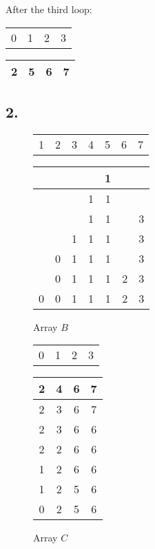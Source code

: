 \documentclass[a4paper,12pt]{article}
\begin{document}
After the third loop:
\begin{center}
	\begin{tabular}{cccc}
		0 & 1 & 2 & 3 \\
	\end{tabular}

	\begin{tabular}{|c|c|c|c|}
		\hline 
		2 & 5 & 6 & 7 \\
		\hline
	\end{tabular}
\end{center}

\subsection*{2.}

\begin{figure}[H]
	\begin{minipage}{0.5\textwidth}
		\centering
		\begin{tabular}{ccccccc}
			1 & 2 & 3 & 4 & 5 & 6 & 7 \\
		\end{tabular}

		\begin{tabular}{|c|c|c|c|c|c|c|}
			\hline
			& & & & 1 & & \\ \hline \hline
			& & & 1 & 1 & & \\ \hline \hline
			& & & 1 & 1 & & 3 \\ \hline \hline
			& & 1 & 1 & 1 & & 3 \\ \hline \hline
			& 0 & 1 & 1 & 1 & & 3 \\ \hline \hline
			& 0 & 1 & 1 & 1 & 2 & 3 \\ \hline \hline
			0 & 0 & 1 & 1 & 1 & 2 & 3 \\ \hline
		\end{tabular}
		\caption*{Array $B$}
	\end{minipage}
	\begin{minipage}{0.5\textwidth}
		\centering
		\begin{tabular}{cccc}
			0 & 1 & 2 & 3 \\
		\end{tabular}

		\begin{tabular}{|c|c|c|c|}
			\hline
			2 & 4 & 6 & 7 \\ \hline \hline
			2 & 3 & 6 & 7 \\ \hline \hline
			2 & 3 & 6 & 6 \\ \hline \hline
			2 & 2 & 6 & 6 \\ \hline \hline
			1 & 2 & 6 & 6 \\ \hline \hline
			1 & 2 & 5 & 6 \\ \hline \hline
			0 & 2 & 5 & 6 \\ \hline
		\end{tabular}
		\caption*{Array $C$}
	\end{minipage}
\end{figure}
\end{document}
